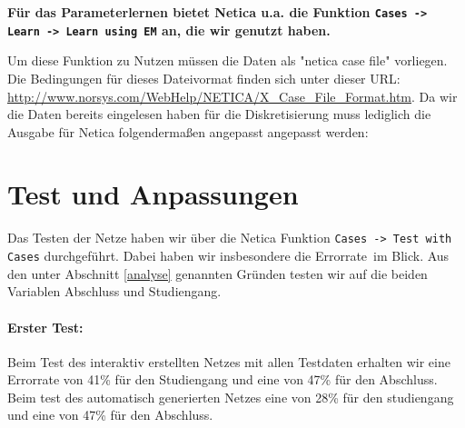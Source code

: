\textbf{Für das Parameterlernen bietet Netica u.a. die Funktion \lstinline{Cases -> Learn -> Learn using EM} an, die wir genutzt haben.}

Um diese Funktion zu Nutzen müssen die Daten als "netica case file" vorliegen. Die Bedingungen für dieses Dateivormat finden sich unter dieser URL: \url{http://www.norsys.com/WebHelp/NETICA/X_Case_File_Format.htm}. Da wir die Daten bereits eingelesen haben für die Diskretisierung muss lediglich die Ausgabe für Netica folgendermaßen angepasst angepasst werden:



\section{Test und Anpassungen}\label{test}
Das Testen der Netze haben wir über die Netica Funktion \lstinline{Cases -> Test with Cases} durchgeführt. Dabei haben wir insbesondere die \glqq Errorrate\grqq \ im Blick. Aus den unter Abschnitt \ref{analyse} genannten Gründen testen wir auf die beiden Variablen Abschluss und Studiengang. 









\paragraph{Erster Test: }Beim Test des interaktiv erstellten Netzes mit allen Testdaten erhalten wir eine Errorrate von 41\% für den Studiengang und eine von 47\% für den Abschluss. Beim test des automatisch generierten Netzes eine von 28\% für den studiengang und eine von 47\% für den Abschluss.

